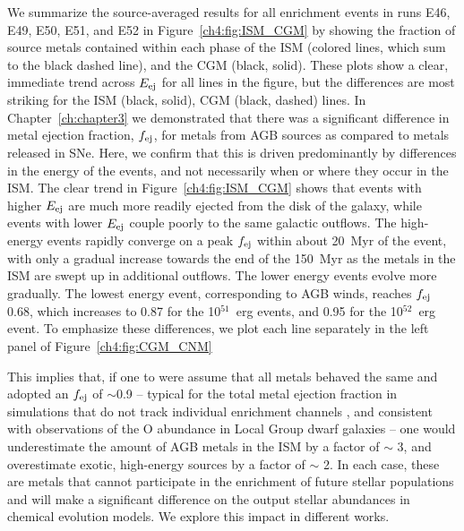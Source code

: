 We summarize the source-averaged results for all enrichment events in runs \runone E46, \runone E49, \runone E50, \runone E51, and \runone E52 in Figure~\ref{ch4:fig:ISM_CGM} by showing the fraction of source metals contained within each phase of the ISM (colored lines, which sum to the black dashed line), and the CGM (black, solid). These plots show a clear, immediate trend across $E_{\rm ej}$ for all lines in the figure, but the differences are most striking for the ISM (black, solid), CGM (black, dashed) lines. In Chapter~\ref{ch:chapter3}
we demonstrated that there was a significant difference in metal ejection fraction, $f_{\rm ej}$, for metals from AGB sources as compared to metals released in SNe. Here, we confirm that this is driven predominantly by differences in the energy of the events, and not necessarily when or where they occur in the ISM. The clear trend in Figure~\ref{ch4:fig:ISM_CGM} shows that events with higher $E_{\rm ej}$ are much more readily ejected from the disk of the galaxy, while events with lower $E_{\rm ej}$ couple poorly to the same galactic outflows.
The high-energy events rapidly converge on a peak $f_{\rm ej}$ within about 20~Myr of the event, with only a gradual increase towards the end of the 150~Myr as the metals in the ISM are swept up in additional outflows. The lower energy events evolve more gradually. The lowest energy event, corresponding to AGB winds, reaches $f_{\rm ej}$ ~ 0.68, which increases to 0.87 for the 10$^{51}$~erg events, and 0.95 for the 10$^{52}$~erg event. To emphasize these differences, we plot each line separately in the left panel of Figure~\ref{ch4:fig:CGM_CNM}

This implies that, if one to were assume that all metals behaved the same and adopted an $f_{\rm ej}$ of $\sim$0.9 -- typical for the total metal ejection fraction in simulations that do not track individual enrichment channels \citep[e.g.][]{Muratov2017,Christensen2018}, and consistent with observations of the O abundance in Local Group dwarf galaxies \citep[e.g.][]{Kirby2011,McQuinn2015} -- one would underestimate the amount of AGB metals in the ISM by a factor of $\sim$ 3, and overestimate exotic, high-energy sources by a factor of $\sim$ 2. In each case, these are metals that cannot participate in the enrichment of future stellar populations and will make a significant difference on the output stellar abundances in chemical evolution models. We explore this impact in different works.

